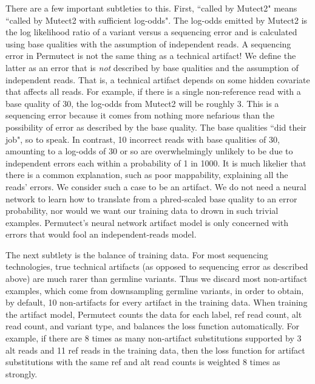 \documentclass[times, twoside, watermark]{StyleBioRxiv}
\begin{document}
There are a few important subtleties to this.  First, ``called by Mutect2" means ``called by Mutect2 with sufficient log-odds".  The log-odds emitted by Mutect2 is the log likelihood ratio of a variant versus a sequencing error and is calculated using base qualities with the assumption of independent reads.  A sequencing error in Permutect is not the same thing as a technical artifact!  We define the latter as an error that is \textit{not} described by base qualities and the assumption of independent reads.  That is, a technical artifact depends on some hidden covariate that affects all reads.  For example, if there is a single non-reference read with a base quality of 30, the log-odds from Mutect2 will be roughly 3.  This is a sequencing error because it comes from nothing more nefarious than the possibility of error as described by the base quality.  The base qualities ``did their job", so to speak.  In contrast, 10 incorrect reads with base qualities of 30, amounting to a log-odds of 30 or so are overwhelmingly unlikely to be due to independent errors each within a probability of 1 in 1000.  It is much likelier that there is a common explanation, such as poor mappability, explaining all the reads' errors.  We consider such a case to be an artifact.  We do not need a neural network to learn how to translate from a phred-scaled base quality to an error probability, nor would we want our training data to drown in such trivial examples.  Permutect's neural network artifact model is only concerned with errors that would fool an independent-reads model.

The next subtlety is the balance of training data.  For most sequencing technologies, true technical artifacts (as opposed to sequencing error as described above) are much rarer than germline variants.  Thus we discard most non-artifact examples, which come from downsampling germline variants, in order to obtain, by default, 10 non-artifacts for every artifact in the training data.  When training the artifact model, Permutect counts the data for each label, ref read count, alt read count, and variant type, and balances the loss function automatically.  For example, if there are 8 times as many non-artifact substitutions supported by 3 alt reads and 11 ref reads in the training data, then the loss function for artifact substitutions with the same ref and alt read counts is weighted 8 times as strongly.
\end{document}
